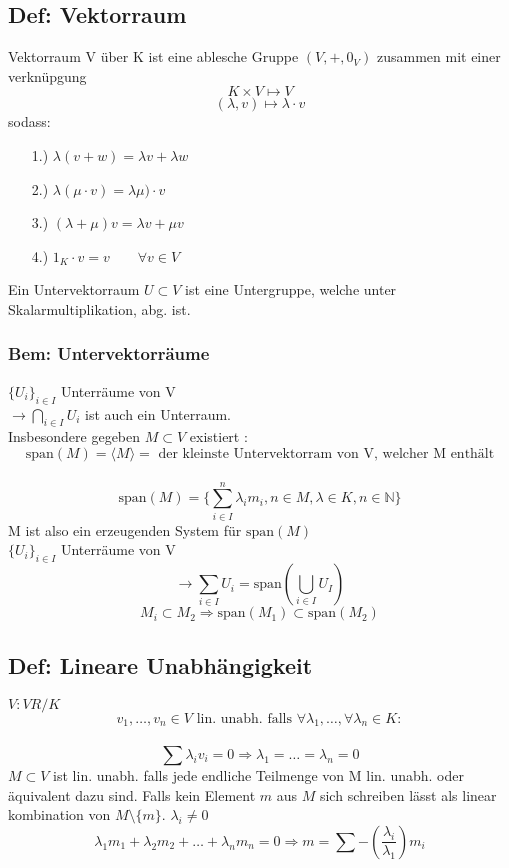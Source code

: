 \documentclass[titlepage,12pt,a4paper,ngerman]{report}
\newcommand{\tx}[1]{\textrm{#1}}
\newcommand{\spa}{\tx{span}}
\begin{document}

\subsection{Def: Vektorraum}
Vektorraum V über K ist eine ablesche Gruppe $(V,+,0_V)$ zusammen mit einer verknüpgung \\
$$ K \times V \mapsto V$$
$$(\lambda, v) \mapsto \lambda\cdot v$$
sodass:
\begin{itemize}
	\item[1.)] $\lambda(v+w) = \lambda v +\lambda w$
	\item[2.)] $\lambda(\mu \cdot v) = \lambda\mu) \cdot v$
	\item[3.)] $(\lambda + \mu) v = \lambda v + \mu v$
	\item[4.)] $ 1_K \cdot v = v \qquad\forall v \in V$
\end{itemize}

Ein Untervektorraum $U\subset V$ ist eine Untergruppe, welche unter Skalarmultiplikation, abg. ist.
\subsubsection{Bem: Untervektorräume} $\{U_i\}_{i\in I}$ Unterräume von V\\
$\rightarrow \bigcap_{i\in I} U_i$ ist auch ein Unterraum.\\
Insbesondere gegeben $M \subset V $ existiert :
$$\spa(M) = \langle M \rangle =\textrm{ der kleinste Untervektorram von V, welcher M enthält}$$\\
$$ \spa(M) = \{\sum^n_{i\in I} \lambda_i m_i, n\in M ,\lambda\in K, n\in \mathbb{N}\}$$
M ist also ein erzeugenden System für $\spa(M)$\\
$\{U_i\}_{i\in I}$ Unterräume von V\\
$$\rightarrow \sum_{i\in I} U_i = \spa (\bigcup_{i\in I} U_I)$$
$$M_i \subset M_2 \Rightarrow \spa(M_1) \subset \spa(M_2)$$
\subsection{Def: Lineare Unabhängigkeit}
$ V : VR/K$\\
$$v_1,\dots, v_n \in V\textrm{ lin. unabh. falls }\forall\lambda_1 , \dots ,\forall\lambda_n \in K: $$\\
$$\sum \lambda_i v_i= 0 \Rightarrow\lambda_1 =  \dots = \lambda_n = 0$$
$M \subset V$ ist lin. unabh. falls jede endliche Teilmenge von M lin. unabh. oder äquivalent dazu sind. Falls kein Element $m$ aus $M$ sich schreiben lässt als linear kombination von $M\setminus \{m \}$.
$\lambda_i \neq 0$\\
$$ \lambda_1 m_1 + \lambda_2m_2 + \dots + \lambda_n m_n = 0 \Rightarrow m = \sum - (\frac{\lambda_i}{\lambda_1}) m_i$$
\end{document}
